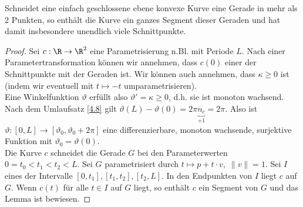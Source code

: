 \documentclass{mycourse}
\newcommand{\tta}{\vartheta}
\begin{document}
\begin{lem}
\label{5.8}
Schneidet eine einfach geschlossene ebene konvexe Kurve eine Gerade in mehr als 2 Punkten, so enthält die Kurve ein ganzes Segment dieser Geraden und hat damit insbesondere unendlich viele Schnittpunkte. \\
\begin{proof}
Sei $c: \R \to \R^2$ eine Parametrisierung n.Bl. mit Periode $L$. Nach einer Parametertransformation können wir annehmen, dass $c(0)$ einer der Schnittpunkte mit der Geraden ist. Wir können auch annehmen, dass $\kappa \geq 0$ ist (indem wir eventuell mit $t \mapsto -t$ umparametrisieren). \\
Eine Winkelfunktion $\tta$ erfüllt also $\tta' = \kappa \geq 0$, d.h. sie ist monoton wachsend. Nach dem Umlaufsatz \ref{4.8} gilt $\tta(L) - \tta(0) = 2 \pi \underbrace{n_c}_{+1} = 2 \pi$. Also ist $\tta : [0, L] \to [\tta_0, \tta_0 + 2 \pi]$ eine differenzierbare, monoton wachsende, surjektive Funktion mit $\tta_0 = \tta(0)$. \\
Die Kurve $c$ schneidet die Gerade $G$ bei den Parameterwerten $0 = t_0 < t_1 < t_2 < L$. Sei $G$ parametrisiert durch $t \mapsto p + t \cdot v, \; \| v \| = 1$. 
Sei $I$ eines der Intervalle $[0, t_1], [t_1, t_2], [t_2, L]$. In den Endpunkten von $I$ liegt $c$ auf $G$. Wenn $c(t)$ für alle $t \in I$ auf $G$ liegt, so enthält $c$ ein Segment von $G$ und das Lemma ist bewiesen.


\end{proof}
\end{lem}
\end{document}

